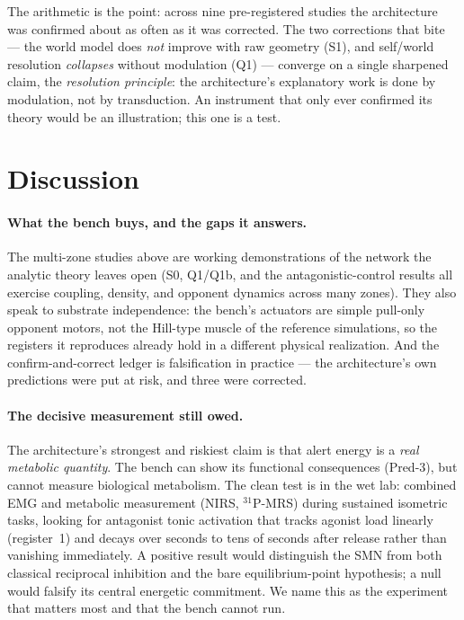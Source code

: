 \documentclass[utf8]{FrontiersinHarvard}
\begin{document}
The arithmetic is the point: across nine pre-registered studies the architecture was confirmed about as often as it was corrected. The two corrections that bite --- the world model does \emph{not} improve with raw geometry (S1), and self/world resolution \emph{collapses} without modulation (Q1) --- converge on a single sharpened claim, the \emph{resolution principle}: the architecture's explanatory work is done by modulation, not by transduction. An instrument that only ever confirmed its theory would be an illustration; this one is a test.

\section{Discussion}\label{sec:discussion}

\paragraph{What the bench buys, and the gaps it answers.} The multi-zone studies above are working demonstrations of the network the analytic theory leaves open (S0, Q1/Q1b, and the antagonistic-control results all exercise coupling, density, and opponent dynamics across many zones). They also speak to substrate independence: the bench's actuators are simple pull-only opponent motors, not the Hill-type muscle of the reference simulations, so the registers it reproduces already hold in a different physical realization. And the confirm-and-correct ledger is falsification in practice --- the architecture's own predictions were put at risk, and three were corrected.

\paragraph{The decisive measurement still owed.} The architecture's strongest and riskiest claim is that alert energy is a \emph{real metabolic quantity}. The bench can show its functional consequences (Pred-3), but cannot measure biological metabolism. The clean test is in the wet lab: combined EMG and metabolic measurement (NIRS, $^{31}$P-MRS) during sustained isometric tasks, looking for antagonist tonic activation that tracks agonist load linearly (register~1) and decays over seconds to tens of seconds after release rather than vanishing immediately. A positive result would distinguish the SMN from both classical reciprocal inhibition and the bare equilibrium-point hypothesis; a null would falsify its central energetic commitment. We name this as the experiment that matters most and that the bench cannot run.
\end{document}
